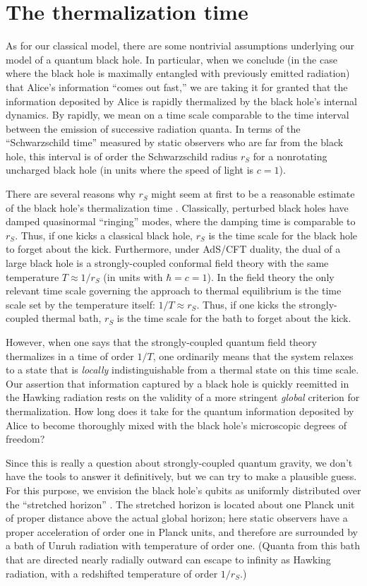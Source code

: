 \documentclass[12pt]{article}
\begin{document}
\section{The thermalization time}
\label{sec:thermalization}
As for our classical model, there are some nontrivial assumptions underlying our model of a quantum black hole. In particular, when we conclude (in the case where the black hole is maximally entangled with previously emitted radiation) that Alice's information ``comes out fast,'' we are taking it for granted that the information deposited by Alice is rapidly thermalized by the black hole's internal dynamics. By rapidly, we mean on a time scale comparable to the time interval between the emission of successive radiation quanta. In terms of the ``Schwarzschild time'' measured by static observers who are far from the black hole, this interval is of order the Schwarzschild radius $r_S$ for a nonrotating uncharged black hole (in units where the speed of light is $c=1$).

There are several reasons why $r_S$ might seem at first to be a reasonable estimate of the black hole's thermalization time \cite{horowitz}. Classically, perturbed black holes have damped quasinormal ``ringing'' modes, where the damping time is comparable to $r_S$. Thus, if one kicks a classical black hole, $r_S$ is the time scale for the black hole to forget about the kick. Furthermore, under AdS/CFT duality, the dual of a large black hole is a strongly-coupled conformal field theory with the same temperature $T\approx 1/r_S$ (in units with $\hbar=c=1$). In the field theory the only relevant time scale governing the approach to thermal equilibrium is the time scale set by the temperature itself: $1/T\approx r_S$. Thus, if one kicks the strongly-coupled thermal bath, $r_S$ is the time scale for the bath to forget about the kick.

However, when one says that the strongly-coupled quantum field theory thermalizes in a time of order $1/T$, one ordinarily means that the system relaxes to a state that is {\em locally} indistinguishable from a thermal state on this time scale. Our assertion that information captured by a black hole is quickly reemitted in the Hawking radiation rests on the validity of a more stringent {\em global} criterion for thermalization. How long does it take for the quantum information deposited by Alice to become thoroughly mixed with the black hole's microscopic degrees of freedom?

Since this is really a question about strongly-coupled quantum gravity, we don't have the tools to answer it definitively, but we can try to make a plausible guess. For this purpose, we envision the black hole's qubits as uniformly distributed over the ``stretched horizon'' \cite{complement,susskind-book}. The stretched horizon is located about one Planck unit of proper distance above the actual global horizon; here static observers have a proper acceleration of order one in Planck units, and therefore are surrounded by a bath of Unruh radiation with temperature of order one. (Quanta from this bath that are directed nearly radially outward can escape to infinity as Hawking radiation, with a redshifted temperature of order $1/r_S$.) 
\end{document}
